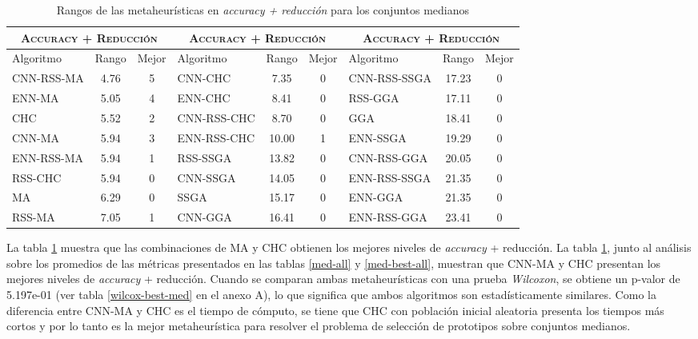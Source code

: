 \begin{table}[h!]
\centering
\begin{adjustbox}{max width =\textwidth}
\begin{tabular}{l c c|l c c|l c c}
\hline
\multicolumn{3}{c|}{\textsc{Accuracy + Reducción}}
	& \multicolumn{3}{c}{\textsc{Accuracy + Reducción}}
	& \multicolumn{3}{c}{\textsc{Accuracy + Reducción}}\\
\hline
Algoritmo & Rango & Mejor & Algoritmo & Rango & Mejor & Algoritmo & Rango & Mejor \\
\hline
\hline

CNN-RSS-MA   & 4.76  & 5 & CNN-CHC      & 7.35  & 0 & CNN-RSS-SSGA & 17.23 & 0 \\
ENN-MA       & 5.05  & 4 & ENN-CHC      & 8.41  & 0 & RSS-GGA      & 17.11 & 0 \\
CHC          & 5.52  & 2 & CNN-RSS-CHC  & 8.70  & 0 & GGA          & 18.41 & 0 \\
CNN-MA       & 5.94  & 3 & ENN-RSS-CHC  & 10.00 & 1 & ENN-SSGA     & 19.29 & 0 \\
ENN-RSS-MA   & 5.94  & 1 & RSS-SSGA     & 13.82 & 0 & CNN-RSS-GGA  & 20.05 & 0 \\
RSS-CHC      & 5.94  & 0 & CNN-SSGA     & 14.05 & 0 & ENN-RSS-SSGA & 21.35 & 0 \\
MA           & 6.29  & 0 & SSGA         & 15.17 & 0 & ENN-GGA      & 21.35 & 0 \\
RSS-MA       & 7.05  & 1 & CNN-GGA      & 16.41 & 0 & ENN-RSS-GGA  & 23.41 & 0 \\

\hline
\end{tabular}
\end{adjustbox}
\caption{Rangos de las metaheurísticas en \emph{accuracy + reducción} para los conjuntos medianos}
\label{rank-med}
\end{table}

La tabla \ref{rank-med} muestra que las combinaciones de MA y CHC obtienen los mejores niveles de \emph{accuracy} + reducción. La tabla \ref{rank-med}, junto al análisis sobre los promedios de las métricas presentados en las tablas \ref{med-all} y \ref{med-best-all}, muestran que CNN-MA y CHC presentan los mejores niveles de \emph{accuracy} + reducción. Cuando se comparan ambas metaheurísticas con una prueba \emph{Wilcoxon}, se obtiene un p-valor de 5.197e-01 (ver tabla \ref{wilcox-best-med} en el anexo A), lo que significa que ambos algoritmos son estadísticamente similares. Como la diferencia entre CNN-MA y CHC es el tiempo de cómputo, se tiene que CHC con población inicial aleatoria presenta los tiempos más cortos y por lo tanto es la mejor metaheurística para resolver el problema de selección de prototipos sobre conjuntos medianos.


